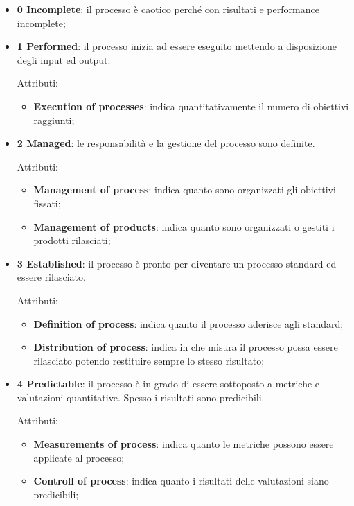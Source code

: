 	\begin{itemize}
		\item \textbf{0 Incomplete}: il processo è caotico perché con risultati e performance incomplete;
	
		\item \textbf{1 Performed}: il processo inizia ad essere eseguito mettendo a disposizione degli input ed output.
		
		Attributi:
		
		\begin{itemize}
			\item \textbf{Execution of processes}: indica quantitativamente il numero di obiettivi raggiunti;
		\end{itemize}
	
		\item \textbf{2 Managed}: le responsabilità e la gestione del processo sono definite.
		
		Attributi:
		
		\begin{itemize}
			\item \textbf{Management of process}: indica quanto sono organizzati gli obiettivi fissati;
			\item \textbf{Management of products}: indica quanto sono organizzati o gestiti i prodotti rilasciati;
		\end{itemize}
	
		\item \textbf{3 Established}: il processo è pronto per diventare un processo standard ed essere rilasciato.
		
		Attributi:
		
		\begin{itemize}
			\item \textbf{Definition of process}: indica quanto il processo aderisce agli standard;
			\item \textbf{Distribution of process}: indica in che misura il processo possa essere rilasciato potendo restituire sempre lo stesso risultato;
		\end{itemize}
	
		\item \textbf{4 Predictable}: il processo è in grado di essere sottoposto a metriche e valutazioni quantitative. Spesso i risultati sono predicibili.
		
		Attributi:
		
		\begin{itemize}
			\item \textbf{Measurements of process}: indica quanto le metriche possono essere applicate al processo;
			\item \textbf{Controll of process}: indica quanto i risultati delle valutazioni siano predicibili;
		\end{itemize}
	

\end{itemize}
